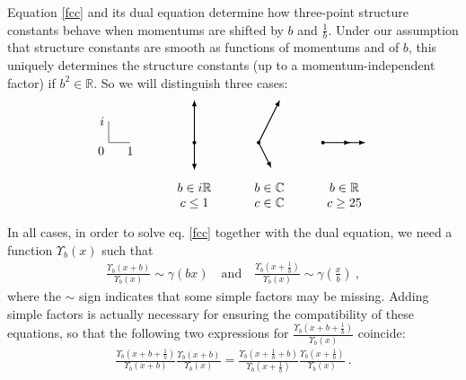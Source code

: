 \documentclass[12pt, a4paper, notitlepage, twoside]{report}
\numberwithin{equation}{section}
\theoremstyle{break}
\begin{document}
Equation \eqref{fcc} and its dual equation determine how three-point structure constants behave when momentums are shifted by $b$ and $\frac{1}{b}$. 
Under our assumption that structure constants are smooth as functions of momentums and of $b$, this uniquely determines the structure constants (up to a momentum-independent factor) if $b^2\in \mathbb{R}$.
So we will distinguish three cases:
\begin{equation}
 \begin{tikzpicture}[baseline=(current  bounding  box.center), scale = .6]
\draw (0, 2) node[left]{$i$} -- (0, 1) node[below left] {$0$} -- (1, 1) node[below] {$1$};
\draw [thick, latex-latex] (4,3) -- (4,1) node[fill, circle, minimum size = 1mm, inner sep = 0]{} -- (4,-.3);
\draw [thick, latex-latex] (8,3) -- (7,1) node[fill, circle, minimum size = 1mm, inner sep = 0]{}-- (7.6,-.2);
\draw [thick, latex-latex] (12,1) -- (10,1) node[fill, circle, minimum size = 1mm, inner sep = 0]{} -- (11.3,1) ;
\node at (4, -1.5){$\begin{array}{c} b\in i\mathbb{R} \\ c\leq 1 \end{array}$};
\node at (7.5, -1.5){$\begin{array}{c} b\in \mathbb{C} \\ c\in\mathbb{C} \end{array}$};
\node at (11, -1.5){$\begin{array}{c} b\in \mathbb{R} \\ c\geq 25 \end{array}$};
 \end{tikzpicture}
\end{equation}
In all cases, in order to solve eq. \eqref{fcc} together with the dual equation, we need a function $\Upsilon_b(x)$ such that 
\begin{align}
 \frac{\Upsilon_b(x+b)}{\Upsilon_b(x)} \sim \gamma(bx)\quad \text{and} \quad \frac{\Upsilon_b(x+\frac{1}{b})}{\Upsilon_b(x)} \sim \gamma(\tfrac{x}{b})\ ,
\end{align}
where the $\sim$ sign indicates that some simple factors may be missing.
Adding simple factors is actually necessary for ensuring the compatibility of these equations, so that the following two expressions for $ \frac{\Upsilon_b(x+b+\frac{1}{b})}{\Upsilon_b(x)}$ coincide:
\begin{align}
  \frac{\Upsilon_b(x+b+\frac{1}{b})}{\Upsilon_b(x+b)} \frac{\Upsilon_b(x+b)}{\Upsilon_b(x)} = \frac{\Upsilon_b(x+\frac{1}{b}+b)}{\Upsilon_b(x+\frac{1}{b})} \frac{\Upsilon_b(x+\frac{1}{b})}{\Upsilon_b(x)} \ .
\end{align}
\end{document}
